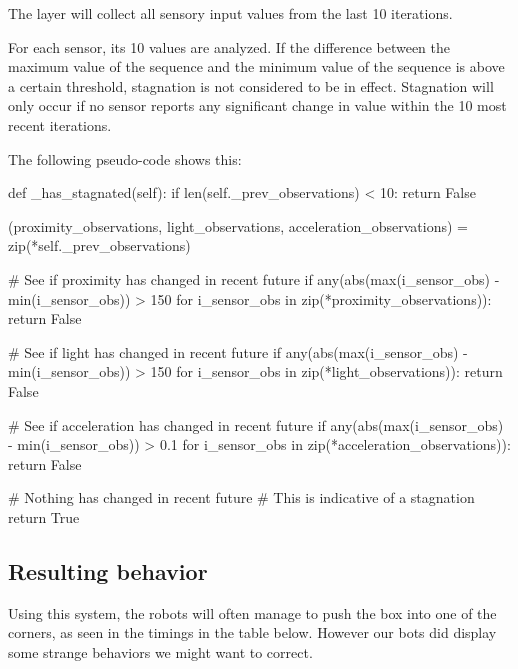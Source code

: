 \documentclass[a4paper,10pt]{article}
\newcommand{\tickspersecond}{10}
\begin{document}
The layer will collect all sensory input values from the last 
{\tickspersecond} iterations.  

For each sensor, its {\tickspersecond} values are analyzed. If the difference 
between the maximum value of the sequence and the minimum value of the 
sequence is above a certain threshold, stagnation is not considered to be in 
effect. Stagnation will only occur if no sensor reports any significant change 
in value within the {\tickspersecond} most recent iterations.

The following pseudo-code shows this:

\begin{python}
def _has_stagnated(self):
    if len(self._prev_observations) < 10:
        return False

    (proximity_observations,
     light_observations,
     acceleration_observations) = zip(*self._prev_observations)

    # See if proximity has changed in recent future
    if any(abs(max(i_sensor_obs) - min(i_sensor_obs)) > 150
           for i_sensor_obs in zip(*proximity_observations)):
        return False

    # See if light has changed in recent future
    if any(abs(max(i_sensor_obs) - min(i_sensor_obs)) > 150
           for i_sensor_obs in zip(*light_observations)):
        return False

    # See if acceleration has changed in recent future
    if any(abs(max(i_sensor_obs) - min(i_sensor_obs)) > 0.1
           for i_sensor_obs in zip(*acceleration_observations)):
        return False

    # Nothing has changed in recent future
    # This is indicative of a stagnation
    return True
\end{python}

\subsection{Resulting behavior}
\label{sec:part-a behavior}

Using this system, the robots will often manage to push the box into one of
the corners, as seen in the timings in the table below. However our bots did
display some strange behaviors we might want to correct.
\end{document}
